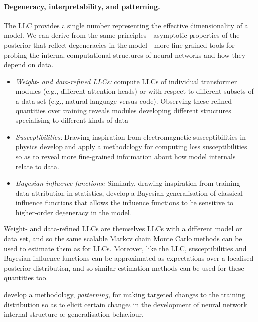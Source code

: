 \documentclass[11pt]{article}
\begin{document}
\paragraph{Degeneracy, interpretability, and patterning.}
The LLC provides a single number representing the effective dimensionality of a model. We can derive from the same principles---asymptotic properties of the posterior that reflect degeneracies in the model---more fine-grained tools for probing the internal computational structures of neural networks and how they depend on data.
\begin{itemize}
    \item\textit{Weight- and data-refined LLCs:}
        \citet{Wang+2025differentiation} compute LLCs of individual transformer modules (e.g., different attention heads) or with respect to different subsets of a data set (e.g., natural language versus code). Observing these refined quantities over training reveals modules developing different structures specialising to different kinds of data.
    
    \item\textit{Susceptibilities:}
        Drawing inspiration from electromagnetic susceptibilities in physics
            \citet{Baker+2025,Wang+2025embryology,Gordon+2026}
        develop and apply a methodology for computing loss susceptibilities so as to reveal more fine-grained information about how model internals relate to data.
        
    \item\textit{Bayesian influence functions:}
        Similarly, drawing inspiration from training data attribution in statistics, 
            \citet{Kreer+2025,Lee+2025,Adam+2025}
        develop a Bayesian generalisation of classical influence functions that allows the influence functions to be sensitive to higher-order degeneracy in the model.
\end{itemize}
Weight- and data-refined LLCs are themselves LLCs with a different model or data set, and so the same scalable Markov chain Monte Carlo methods can be used to estimate them as for LLCs. Moreover, like the LLC, susceptibilities and Bayesian influence functions can be approximated as expectations over a localised posterior distribution, and so similar estimation methods can be used for these quantities too.

\citet{Wang+Murfet2026} develop a methodology, \emph{patterning}, for making targeted changes to the training distribution so as to elicit certain changes in the development of neural network internal structure or generalisation behaviour.
\end{document}
